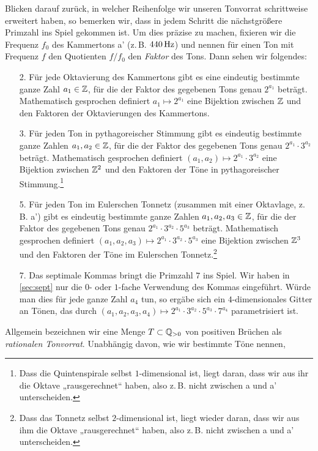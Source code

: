 Blicken darauf zurück, in welcher Reihenfolge wir unseren Tonvorrat schrittweise
erweitert haben, so bemerken wir, dass in jedem Schritt die nächstgrößere
Primzahl ins Spiel gekommen ist. Um dies präzise zu machen, fixieren wir die
Frequenz $f_0$ des Kammertons a’ (z.\,B. $440\,\text{Hz}$) und nennen für einen Ton mit
Frequenz $f$ den Quotienten $f/f_0$ den \emph{Faktor} des Tons. Dann sehen wir
folgendes:
\begin{enumerate}
	\item[2.] Für jede Oktavierung des Kammertons gibt es eine eindeutig bestimmte
	ganze Zahl $a_1\in\mathbb{Z}$, für die der Faktor des gegebenen Tons genau $2^{a_1}$
	beträgt. Mathematisch gesprochen definiert $a_1\mapsto 2^{a_1}$ eine Bijektion
	zwischen $\mathbb{Z}$ und den Faktoren der Oktavierungen des Kammertons.
	\item[3.] Für jeden Ton in pythagoreischer Stimmung gibt es eindeutig bestimmte
	ganze Zahlen $a_1,a_2\in\mathbb{Z}$, für die der Faktor des gegebenen Tons genau
	$2^{a_1}\cdot 3^{a_2}$ beträgt. Mathematisch gesprochen definiert
	$(a_1,a_2)\mapsto 2^{a_1}\cdot 3^{a_2}$ eine Bijektion zwischen $\mathbb{Z}^2$ und den
	Faktoren der Töne in pythagoreischer Stimmung.\footnote{Dass die
		Quintenspirale selbst $1$-dimensional ist, liegt daran, dass wir aus ihr die
		Oktave „rausgerechnet“ haben, also z.\,B. nicht zwischen \flat a und \flat
		a’ unterscheiden.}
	\item[5.] Für jeden Ton im Eulerschen Tonnetz (zusammen mit einer Oktavlage,
	z.\,B. \flatp a’) gibt es eindeutig bestimmte ganze Zahlen $a_1,a_2,a_3\in\mathbb{Z}$,
	für die der Faktor des gegebenen Tons genau
	$2^{a_1}\cdot 3^{a_2}\cdot 5^{a_3}$ beträgt.  Mathematisch gesprochen
	definiert $(a_1,a_2,a_3)\mapsto 2^{a_1}\cdot 3^{a_2}\cdot 5^{a_3}$ eine
	Bijektion zwischen $\mathbb{Z}^3$ und den Faktoren der Töne im Eulerschen
	Tonnetz.\footnote{Dass das Tonnetz selbst $2$-dimensional ist, liegt wieder
		daran, dass wir aus ihm die Oktave „rausgerechnet“ haben, also z.\,B. nicht
		zwischen \flatp a und \flatp a’ unterscheiden.}
	\item[7.] Das septimale Kommas bringt die Primzahl $7$ ins Spiel. Wir haben in
	\cref{sec:sept} nur die $0$- oder $1$-fache Verwendung des Kommas
	eingeführt. Würde man dies für jede ganze Zahl $a_4$ tun, so ergäbe sich ein
	$4$-dimensionales Gitter an Tönen, das durch
	$(a_1,a_2,a_3,a_4)\mapsto 2^{a_1}\cdot 3^{a_2}\cdot 5^{a_3}\cdot 7^{a_4}$
	parametrisiert ist.
\end{enumerate}
Allgemein bezeichnen wir eine Menge $T\subset \mathbb{Q}_{>0}$ von positiven Brüchen als
\emph{rationalen Tonvorrat}.  Unabhängig davon, wie wir bestimmte Töne nennen,
